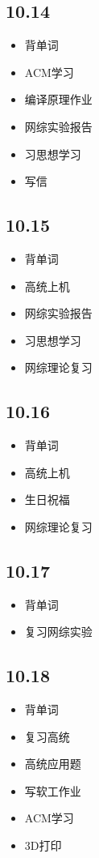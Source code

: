 \documentclass[UTF8]{ctexart}
\begin{document}
\subsection*{10.14}
\begin{itemize}
    \item 背单词
    \item ACM学习
    \item 编译原理作业
    \item 网综实验报告
    \item 习思想学习
    \item 写信
\end{itemize}

\subsection*{10.15}
\begin{itemize}
    \item 背单词
    \item 高统上机
    \item 网综实验报告
    \item 习思想学习
    \item 网综理论复习
\end{itemize}

\subsection*{10.16}
\begin{itemize}
    \item 背单词
    \item 高统上机
    \item 生日祝福
    \item 网综理论复习
\end{itemize}

\subsection*{10.17}
\begin{itemize}
    \item 背单词
    \item 复习网综实验
\end{itemize}

\subsection*{10.18}
\begin{itemize}
    \item 背单词
    \item 复习高统
    \item 高统应用题
    \item 写软工作业
    \item ACM学习
    \item 3D打印
\end{itemize}
\end{document}
